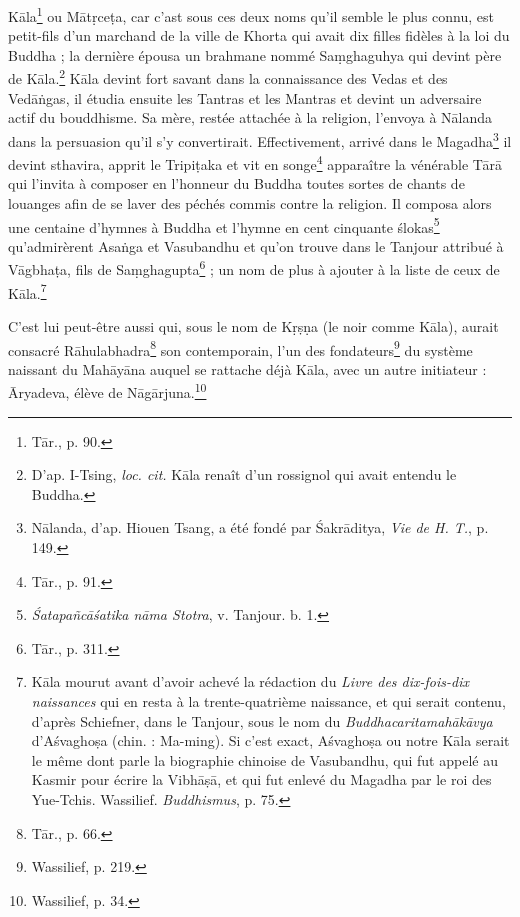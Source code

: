 \documentclass[a4paper, 11pt, oneside, french, landscape, twocolumn]{article}
\begin{document}
K\={a}la\footnote{T\={a}r., p. 90.} ou M\={a}t\d{r}ce\d{t}a, car c'ast sous ces deux noms qu'il semble le plus connu, est petit-fils d'un marchand de la ville de Khorta qui avait dix filles fidèles à la loi du Buddha ; la dernière épousa un brahmane nommé Sa\d{m}ghaguhya qui devint père de K\={a}la.\footnote{D'ap. I-Tsing, \emph{loc. cit.} K\={a}la renaît d'un rossignol qui avait entendu le Buddha.} K\={a}la devint fort savant dans la connaissance des Vedas et des Ved\={a}\.{n}gas, il étudia ensuite les Tantras et les Mantras et devint un adversaire actif du bouddhisme. Sa mère, restée attachée à la religion, l'envoya à N\={a}landa dans la persuasion qu'il s'y convertirait. Effectivement, arrivé dans le Magadha\footnote{N\={a}landa, d'ap. Hiouen Tsang, a été fondé par \'{S}akr\={a}ditya, \emph{Vie de H. T.}, p. 149.} il devint sthavira, apprit le Tripi\d{t}aka et vit en songe\footnote{T\={a}r., p. 91.} apparaître la vénérable T\={a}r\={a} qui l'invita à composer en l'honneur du Buddha toutes sortes de chants de louanges afin de se laver des péchés commis contre la religion. Il composa alors une centaine d'hymnes à Buddha et l'hymne en cent cinquante \'{s}lokas\footnote{\emph{\'{S}atapa\~{n}c\={a}\'{s}atika n\={a}ma Stotra}, v. Tanjour. b. 1.} qu'admirèrent Asa\.{n}ga et Vasubandhu et qu'on trouve dans le Tanjour attribué à V\={a}gbha\d{t}a, fils de Sa\d{m}ghagupta\footnote{T\={a}r., p. 311.} ; un nom de plus à ajouter à la liste de ceux de K\={a}la.\footnote{K\={a}la mourut avant d'avoir achevé la rédaction du \emph{Livre des dix-fois-dix naissances} qui en resta à la trente-quatrième naissance, et qui serait contenu, d'après Schiefner, dans le Tanjour, sous le nom du \emph{Buddhacaritamah\={a}k\={a}vya} d'A\'{s}vagho\d{s}a (chin. : Ma-ming). Si c'est exact, A\'{s}vagho\d{s}a ou notre K\={a}la serait le même dont parle la biographie chinoise de Vasubandhu, qui fut appelé au Kasmir pour écrire la Vibh\={a}\d{s}\={a}, et qui fut enlevé du Magadha par le roi des Yue-Tchis. Wassilief. \emph{Buddhismus}, p. 75.}

C'est lui peut-être aussi qui, sous le nom de K\d{r}\d{s}\d{n}a (le noir comme K\={a}la), aurait consacré R\={a}hulabhadra\footnote{T\={a}r., p. 66.} son contemporain, l'un des fondateurs\footnote{Wassilief, p. 219.} du système naissant du Mah\={a}y\={a}na auquel se rattache déjà K\={a}la, avec un autre initiateur : \={A}ryadeva, élève de N\={a}g\={a}rjuna.\footnote{Wassilief, p. 34.}
\end{document}
